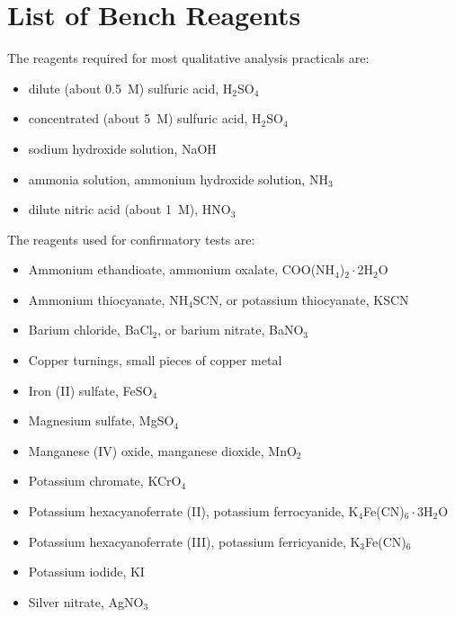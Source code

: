 \section{List of Bench Reagents}

The reagents required for most qualitative analysis practicals are:
\begin{itemize}
\item{dilute (about 0.5~M) sulfuric acid, 
H$_{2}$SO$_{4}$}
\item{concentrated (about 5~M) sulfuric acid, 
H$_{2}$SO$_{4}$}
\item{sodium hydroxide solution, 
NaOH}
\item{ammonia solution, 
ammonium hydroxide solution, 
NH$_{3}$}
\item{dilute nitric acid (about 1~M), 
HNO$_{3}$}
\end{itemize}

The reagents used for confirmatory tests are:
\begin{itemize}
\item{Ammonium ethandioate, 
ammonium oxalate, 
COO(NH$_{4}$)$_{2} \cdot$2H$_{2}$O}
\item{Ammonium thiocyanate, 
NH$_{4}$SCN, 
or potassium thiocyanate, 
KSCN}
\item{Barium chloride, 
BaCl$_{2}$, 
or barium nitrate, 
BaNO$_{3}$}
\item{Copper turnings, 
small pieces of copper metal}
\item{Iron (II) sulfate, 
FeSO$_{4}$}
\item{Magnesium sulfate, 
MgSO$_{4}$}
\item{Manganese (IV) oxide, 
manganese dioxide, 
MnO$_{2}$}
\item{Potassium chromate, 
KCrO$_{4}$}
\item{Potassium hexacyanoferrate (II), 
potassium ferrocyanide, 
K$_{4}$Fe(CN)$_{6} \cdot$3H$_{2}$O}
\item{Potassium hexacyanoferrate (III), 
potassium ferricyanide, 
K$_{3}$Fe(CN)$_{6}$}
\item{Potassium iodide, 
KI}
\item{Silver nitrate, 
AgNO$_{3}$}
\end{itemize}

